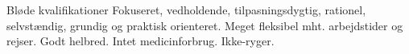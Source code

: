\begin{rubric}{Bløde kvalifikationer}
\entry* Fokuseret, vedholdende, tilpasningsdygtig, rationel, selvstændig, grundig og praktisk orienteret.
\entry* Meget fleksibel mht. arbejdstider og rejser.
\entry* Godt helbred. Intet medicinforbrug. Ikke-ryger.
\end{rubric}
